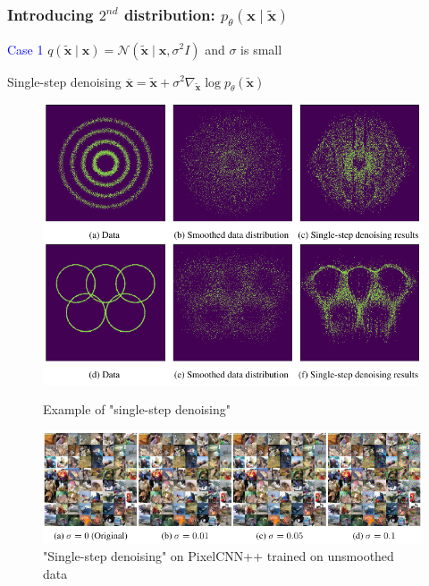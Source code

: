 \documentclass[t]{beamer}  %
\begin{document}
\begin{frame}[h]
\frametitle{Introducing $2^{nd}$ distribution: $p_{\theta}(\bm{x} \mid \tilde{\bm{x}})$}
\textcolor{blue}{Case 1} $q(\tilde{\bm{x}} \mid \bm{x})=\mathcal{N}\left(\tilde{\bm{x}} \mid \bm{x}, \sigma^{2} I\right)$ and $\sigma$ is small
\begin{block}{Single-step denoising \cite{single_step}}
\footnotesize
$
\overline{\bm{x}}=\tilde{\bm{x}}+\sigma^{2} \nabla_{\tilde{\bm{x}}} \log p_{\theta}(\tilde{\bm{x}})
$
\end{block}

\begin{figure}[ht]
        \begin{minipage}[b]{0.45\linewidth}
            \centering
            \includegraphics[width=\textwidth]{single_step.pdf}
            \caption{Example of "single-step denoising"}
        \end{minipage}
        \hspace{0.2cm}
        \begin{minipage}[b]{0.45\linewidth}
            \centering
            \includegraphics[width=\textwidth]{impl_single_step.pdf}
            \caption{"Single-step denoising" on PixelCNN++ trained on unsmoothed data}
        \end{minipage}
    \end{figure}

\end{frame}
\end{document}
